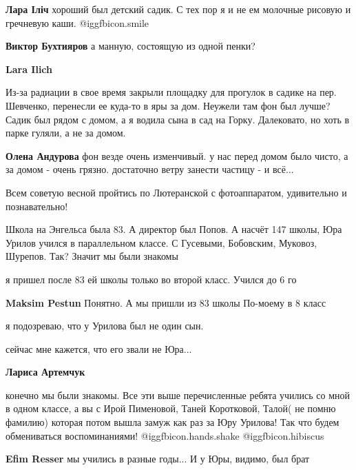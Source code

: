 \begin{itemize}
\begin{itemize} %
\textbf{Лара Іліч} хороший был детский садик. С тех пор я и не ем молочные рисовую и гречневую каши.  @igg{fbicon.smile} 

\textbf{Виктор Бухтияров} а манную, состоящую из одной пенки?

\textbf{Lara Ilich} 

Из-за радиации в свое время закрыли площадку для прогулок в садике на
пер. Шевченко, перенесли ее куда-то в яры за дом. Неужели там фон был лучше? Садик
был рядом с домом, а я водила сына в сад на Горку. Далековато, но хоть в парке
гуляли, а не за домом.


\textbf{Олена Андурова} фон везде очень изменчивый. у нас перед домом было чисто, а за домом - очень грязно. достаточно ветру занести частицу - и всё...
\end{itemize} %

Всем советую весной пройтись по Лютеранской с фотоаппаратом, удивительно и познавательно!

Школа на Энгельса была 83.
А директор был Попов.
А насчёт 147 школы, Юра Урилов учился в параллельном классе.
С Гусевыми, Бобовским, Муковоз, Шурепов.
Так?
Значит мы были знакомы

\begin{itemize} %
я пришел после 83 ей школы только во второй класс. Учился до 6 го

\begin{itemize} %
\textbf{Maksim Pestun}
Понятно. А мы пришли из 83 школы
По-моему в 8 класс

я подозреваю, что у Урилова был не один сын.

сейчас мне кажется, что его звали не Юра...
\end{itemize} %

\textbf{Лариса Артемчук} 

конечно мы были знакомы. Все эти выше перечисленные ребята учились со мной в
одном классе, а вы с Ирой Пименовой, Таней Коротковой, Талой( не помню фамилию)
которая потом вышла замуж как раз за Юру Урилова! Так что будем обмениваться
воспоминаниями! @igg{fbicon.hands.shake}  @igg{fbicon.hibiscus} 

\begin{itemize} %
\textbf{Efim Resser} мы учились в разные годы... И у Юры, видимо, был брат


\end{itemize}
\end{itemize}
\end{itemize}
